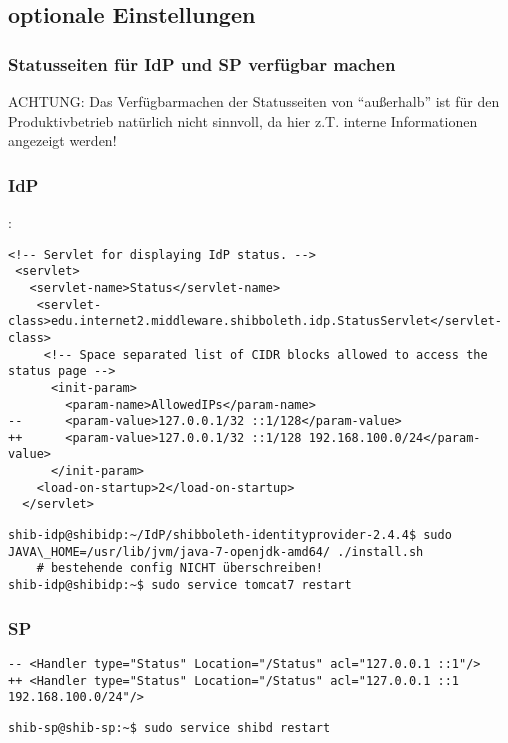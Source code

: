 \subsection{optionale Einstellungen}
\subsubsection{Statusseiten für IdP und SP verfügbar machen}
ACHTUNG: Das Verfügbarmachen der Statusseiten von "`außerhalb"' ist für den
Produktivbetrieb natürlich nicht sinnvoll, da hier z.T. interne Informationen
angezeigt werden!
\subsubsection*{IdP}
:
\begin{lstlisting}
<!-- Servlet for displaying IdP status. -->
 <servlet>
   <servlet-name>Status</servlet-name>
    <servlet-class>edu.internet2.middleware.shibboleth.idp.StatusServlet</servlet-class>
     <!-- Space separated list of CIDR blocks allowed to access the status page -->
      <init-param>
        <param-name>AllowedIPs</param-name>
--      <param-value>127.0.0.1/32 ::1/128</param-value>
++      <param-value>127.0.0.1/32 ::1/128 192.168.100.0/24</param-value>
      </init-param>
    <load-on-startup>2</load-on-startup>
  </servlet>
\end{lstlisting}
\begin{lstlisting}
shib-idp@shibidp:~/IdP/shibboleth-identityprovider-2.4.4$ sudo JAVA\_HOME=/usr/lib/jvm/java-7-openjdk-amd64/ ./install.sh
	# bestehende config NICHT überschreiben!
shib-idp@shibidp:~$ sudo service tomcat7 restart
\end{lstlisting}
\subsubsection{SP}
\begin{lstlisting}
-- <Handler type="Status" Location="/Status" acl="127.0.0.1 ::1"/>
++ <Handler type="Status" Location="/Status" acl="127.0.0.1 ::1  192.168.100.0/24"/>
\end{lstlisting}
\begin{lstlisting}
shib-sp@shib-sp:~$ sudo service shibd restart
\end{lstlisting}
